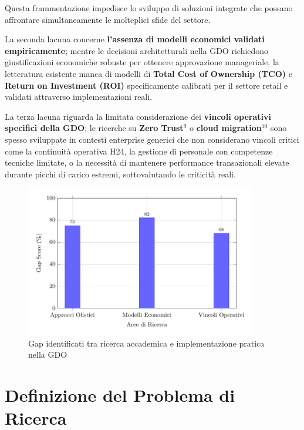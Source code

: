 \documentclass[12pt,a4paper,oneside]{book}
\numberwithin{figure}{chapter} %
\numberwithin{table}{chapter}  %
\begin{document}
Questa frammentazione impedisce lo sviluppo di soluzioni integrate che
possano affrontare simultaneamente le molteplici sfide del settore.

La seconda lacuna concerne \textbf{l'assenza di modelli economici validati
empiricamente}; mentre le decisioni architetturali nella GDO richiedono
giustificazioni economiche robuste per ottenere approvazione
manageriale, la letteratura esistente manca di modelli di \textbf{Total
Cost of Ownership (TCO)} e \textbf{Return on Investment (ROI)}
specificamente calibrati per il settore retail e validati attraverso
implementazioni reali.

La terza lacuna riguarda la limitata considerazione dei \textbf{vincoli
operativi specifici della GDO}; le ricerche su \textbf{Zero Trust}$^9$ o
\textbf{cloud migration}$^{10}$ sono spesso sviluppate in contesti enterprise
generici che non considerano vincoli critici come la continuità
operativa H24, la gestione di personale con competenze tecniche
limitate, o la necessità di mantenere performance transazionali elevate
durante picchi di carico estremi, sottovalutando le criticità reali.

\begin{figure}[htbp]
    \centering
    \includegraphics[width=0.9\textwidth]{figura 1-1}
    \caption{Gap identificati tra ricerca accademica e implementazione pratica nella GDO}
\label{fig:gap_ricerca}
\end{figure}

\section{\texorpdfstring{\textbf{Definizione del Problema di
Ricerca}}{1.2 Definizione del Problema di Ricerca}}\label{definizione-del-problema-di-ricerca}
\end{document}
